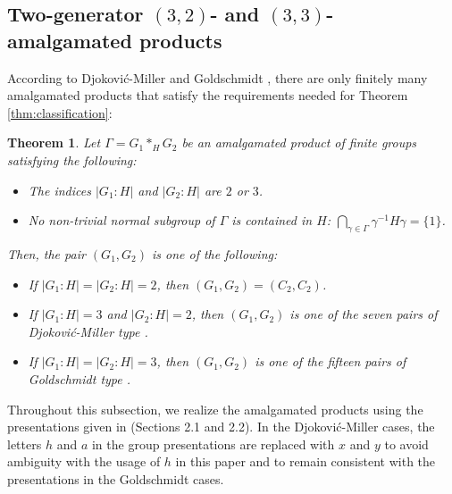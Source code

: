 \documentclass[12pt,leqno]{amsart}
\newcommand{\2}{L^2_{\rm per}(0, T)}
\newtheorem{thm}{Theorem}[section]
\numberwithin{equation}{section}
\numberwithin{figure}{section}
\begin{document}
\subsection{Two-generator \texorpdfstring{$(3,2)$}{(3,2)}- and \texorpdfstring{$(3,3)$}{(3,3)}-amalgamated products}\label{subsec:3_3_amalgam}
According to Djokovi\'c-Miller \cite{djokovic1977regular} and Goldschmidt \cite{goldschmidt1980automorphisms}, there are only finitely many amalgamated products that satisfy the requirements needed for Theorem \ref{thm:classification}:
\begin{thm}\label{thm:3_3_amalgam}
    Let $\Gamma = G_1*_H G_2$ be an amalgamated product of finite groups satisfying the following:
    \begin{itemize}
        \item The indices $\lvert G_1: H\rvert$ and $\lvert G_2: H\rvert$ are $2$ or $3$.
        \item No non-trivial normal subgroup of $\Gamma$ is contained in $H$: $\bigcap_{\gamma\in\Gamma} \gamma^{-1}H\gamma = \{1\}$.
    \end{itemize}
    Then, the pair $(G_1,G_2)$ is one of the following:
    \begin{itemize}
        \item If $\lvert G_1: H\rvert = \lvert G_2: H\rvert = 2$, then $(G_1,G_2) = (C_2,C_2)$.
        \item If $\lvert G_1: H\rvert = 3$ and $\lvert G_2: H\rvert = 2$, then $(G_1,G_2)$ is one of the seven pairs of Djokovi\'c-Miller type \cite{djokovic1977regular}.
        \item If $\lvert G_1: H\rvert = \lvert G_2: H\rvert = 3$, then $(G_1,G_2)$ is one of the fifteen pairs of Goldschmidt type \cite{goldschmidt1980automorphisms}.
    \end{itemize}
\end{thm}
Throughout this subsection, we realize the amalgamated products using the presentations given in \cite{conder2025edge} (Sections 2.1 and 2.2). In the Djokovi\'c-Miller cases, the letters $h$ and $a$ in the group presentations are replaced with $x$ and $y$ to avoid ambiguity with the usage of $h$ in this paper and to remain consistent with the presentations in the Goldschmidt cases.
\end{document}
